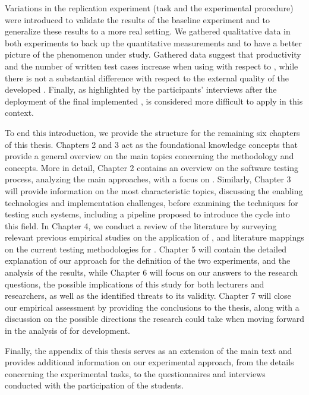Variations in the replication experiment (task and the experimental procedure) were introduced to validate the results of the baseline experiment and to generalize these results to a more real setting. 
We gathered qualitative data in both experiments to back up the quantitative measurements and to have a better picture of the phenomenon under study. Gathered data suggest that productivity and the number of written test cases increase when using \tdd with respect to \notdd, while there is not a substantial difference with respect to the external quality of the developed \ess.
Finally, as highlighted by the participants' interviews after the deployment of the final implemented \es, \tdd is considered more difficult to apply in this context.

To end this introduction, we provide the structure for the remaining six chapters of this thesis.
Chapters 2 and 3 act as the foundational knowledge concepts that provide a general overview on the main topics concerning the \tdd methodology and \ess concepts. More in detail, Chapter 2 contains an overview on the software testing process, analyzing the main approaches, with a focus on \tdd. 
Similarly, Chapter 3 will provide information on the most characteristic \ess topics, discussing the enabling technologies and implementation challenges, before examining the techniques for testing such systems, including a pipeline proposed to introduce the \tdd cycle into this field.
In Chapter 4, we conduct a review of the literature by surveying relevant previous empirical studies on the application of \tdd, and literature mappings on the current testing methodologies for \ess.
Chapter 5 will contain the detailed explanation of our approach for the definition of the two experiments, and the analysis of the results, while Chapter 6 will focus on our answers to the research questions, the possible implications of this study for both lecturers and researchers, as well as the identified threats to its validity.
Chapter 7 will close our empirical assessment by providing the conclusions to the thesis, along with a discussion on the possible directions the research could take when moving forward in the analysis of \tdd for \es development.

Finally, the appendix of this thesis serves as an extension of the main text and provides additional information on our experimental approach, from the details concerning the experimental tasks, to the questionnaires and interviews conducted with the participation of the students.